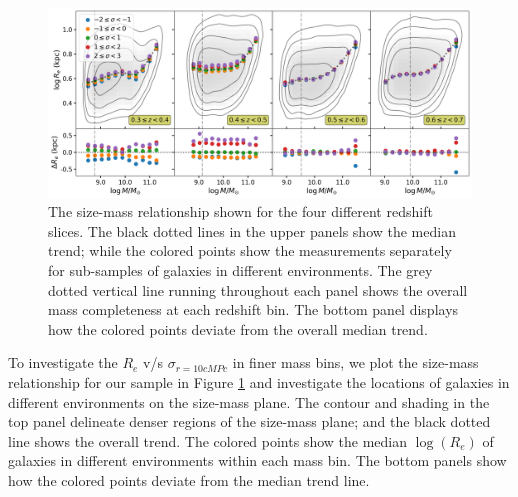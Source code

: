 \begin{figure}[htb]
    \centering
    \includegraphics[width = \textwidth]{r_m_all.png}
    \caption{The size-mass relationship shown for the four different redshift slices. The black dotted lines in the upper panels show the median trend; while the colored points show the measurements separately for sub-samples of galaxies in different environments. The grey dotted vertical line running throughout each panel shows the overall mass completeness at each redshift bin. The bottom panel displays how the colored points deviate from the overall median trend.}
    \label{fig_c4:r_m_all}
\end{figure}

To investigate the $R_e$ v/s $\sigma_{r=10cMPc}$ in finer mass bins, we plot the size-mass relationship for our sample in Figure \ref{fig_c4:r_m_all} and investigate the locations of galaxies in different environments on the size-mass plane. The contour and shading in the top panel delineate denser regions of the size-mass plane; and the black dotted line shows the overall trend. The colored points show the median $\log(R_e)$ of galaxies in different environments within each mass bin. The bottom panels show how the colored points deviate from the median trend line. 

